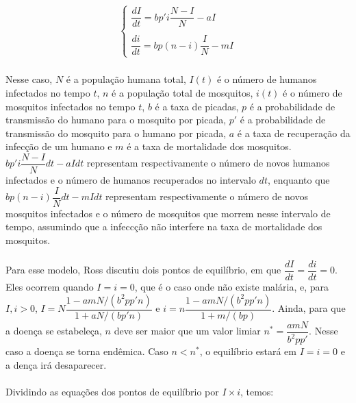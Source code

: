 \documentclass[12pt]{article}
\begin{document}
\begin{gather*}
\begin{cases}
\dfrac{dI}{dt} = bp'i\dfrac{N-I}{N} -aI\\
\\
\dfrac{di}{dt} = bp(n-i)\dfrac{I}{N} - mI
\end{cases}
\end{gather*}
\\
Nesse caso, $N$ é a população humana total, $I(t)$ é o número de humanos infectados no tempo $t$, $n$ é a população total de mosquitos, $i(t)$ é o número de mosquitos infectados no tempo $t$, $b$ é a taxa de picadas, $p$ é a probabilidade de transmissão do humano para o mosquito por picada, $p'$ é a probabilidade de transmissão do mosquito para o humano por picada, $a$ é a taxa de recuperação da infecção de um humano e $m$ é a taxa de mortalidade dos mosquitos. $bp'i\dfrac{N-I}{N}dt -aIdt$ representam respectivamente o número de novos humanos infectados e o número de humanos recuperados no intervalo $dt$, enquanto que $bp(n-i)\dfrac{I}{N}dt - mIdt$ representam respectivamente o número de novos mosquitos infectados e o número de mosquitos que morrem nesse intervalo de tempo, assumindo que a infeccção não interfere na taxa de mortalidade dos mosquitos.
\\\\
Para esse modelo, Ross discutiu dois pontos de equilíbrio, em que $\dfrac{dI}{dt} = \dfrac{di}{dt} = 0$. Eles ocorrem quando $I=i=0$, que é o caso onde não existe malária, e, para $I, i > 0$, $I = N\dfrac{1-amN/(b^2pp'n)}{1+aN/(bp'n)}$ e $i = n\dfrac{1-amN/(b^2pp'n)}{1+m/(bp)}$. Ainda, para que a doença se estabeleça, $n$ deve ser maior que um valor limiar $n^* = \dfrac{amN}{b^2pp'}$. Nesse caso a doença se torna endêmica. Caso $n<n^*$, o equilíbrio estará em $I=i=0$ e a dença irá desaparecer.
\\\\
Dividindo as equações dos pontos de equilíbrio por $I \times i$, temos:
\end{document}
